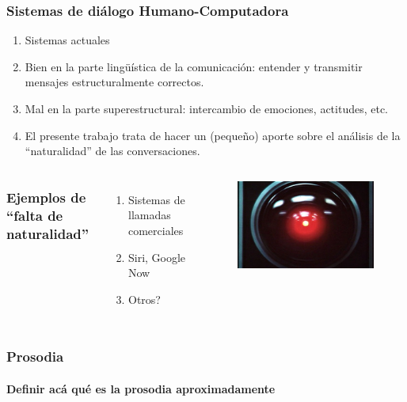\begin{frame}
  \frametitle{Sistemas de diálogo Humano-Computadora}

  \begin{enumerate}[<+->]
    \item Sistemas actuales
    \item Bien en la parte lingüística de la comunicación: entender y transmitir mensajes estructuralmente correctos.
    \item Mal en la parte superestructural: intercambio de emociones, actitudes, etc.
    \item El presente trabajo trata de hacer un (pequeño) aporte sobre el análisis de la ``naturalidad'' de las conversaciones.
  \end{enumerate}
\end{frame}


\begin{frame}
  \begin{columns}
    \frametitle{Ejemplos de ``falta de naturalidad''}
    \begin{enumerate}
      \item Sistemas de llamadas comerciales
      \item Siri, Google Now
      \item Otros?
    \end{enumerate}
    \begin{figure}
      \includegraphics[scale=0.25]{images/hal.jpg}
    \end{figure}
  \end{columns}
\end{frame}


\begin{frame}
  \frametitle{Prosodia}
  \framesubtitle{Definir acá qué es la prosodia aproximadamente}

\end{frame}



